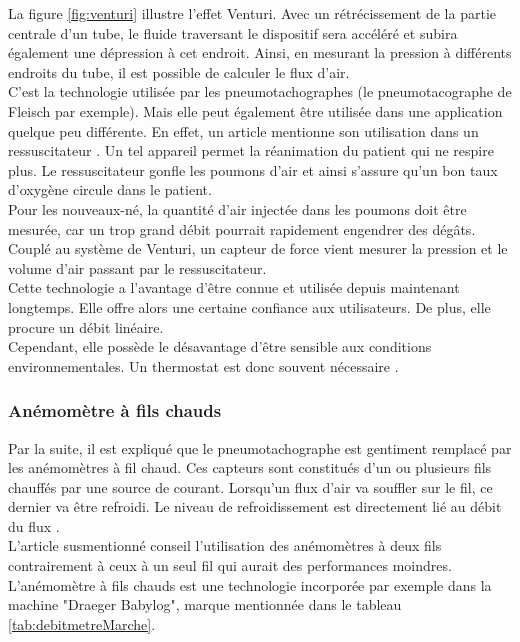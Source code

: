 La figure \ref{fig:venturi} illustre l'effet Venturi. Avec un rétrécissement de la partie centrale d'un tube, le fluide traversant le dispositif 
sera accéléré et subira également une dépression à cet endroit. Ainsi, en mesurant la pression à différents endroits du tube, il est possible 
de calculer le flux d'air. \\

C'est la technologie utilisée par les pneumotachographes (le pneumotacographe de Fleisch par exemple). Mais elle peut également être utilisée 
dans une application quelque peu différente. En effet, un article mentionne son utilisation dans un ressuscitateur \cite{jacq_ultra-low_2011}. 
Un tel appareil permet la réanimation du patient qui ne respire plus. Le ressuscitateur gonfle les poumons d'air et ainsi s'assure qu'un bon 
taux d'oxygène circule dans le patient. \\
Pour les nouveaux-né, la quantité d'air injectée dans les poumons doit être mesurée, car un trop grand débit pourrait rapidement engendrer 
des dégâts. \\
Couplé au système de Venturi, un capteur de force vient mesurer la pression et le volume d'air passant par le ressuscitateur. \\

Cette technologie a l'avantage d'être connue et utilisée depuis maintenant longtemps. Elle offre alors une certaine confiance aux utilisateurs. 
De plus, elle procure un débit linéaire. \\
Cependant, elle possède le désavantage d'être sensible aux conditions environnementales. Un thermostat est donc souvent nécessaire \cite{fischberg_pratique_2009}.

\subsubsection{Anémomètre à fils chauds}
Par la suite, il est expliqué que le pneumotachographe est gentiment remplacé par les anémomètres à fil chaud. Ces capteurs sont 
constitués d'un ou plusieurs fils chauffés par une source de courant. Lorsqu'un flux d'air va souffler sur le fil, ce dernier va être refroidi. 
Le niveau de refroidissement est directement lié au débit du flux \cite{oberg_biomedical_2011}. \\
L'article susmentionné conseil l'utilisation des anémomètres à deux fils contrairement à ceux à un seul fil qui aurait des performances 
moindres. 
L'anémomètre à fils chauds est une technologie incorporée par exemple dans la machine "Draeger Babylog", marque mentionnée dans le tableau \ref{tab:debitmetreMarche}. \\

